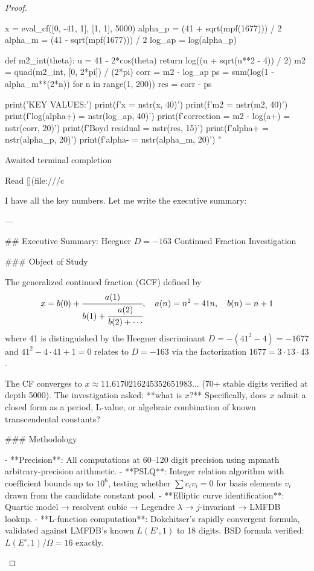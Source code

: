 \begin{theorem}
\begin{lemma}
\begin{proposition}
\begin{corollary}
\begin{proof}
\begin{remark}
x = eval_cf([0, -41, 1], [1, 1], 5000)
alpha_p = (41 + sqrt(mpf(1677))) / 2
alpha_m = (41 - sqrt(mpf(1677))) / 2
log_ap = log(alpha_p)

def m2_int(theta):
    u = 41 - 2*cos(theta)
    return log((u + sqrt(u**2 - 4)) / 2)
m2 = quad(m2_int, [0, 2*pi]) / (2*pi)
corr = m2 - log_ap
ps = sum(log(1 - alpha_m**(2*n)) for n in range(1, 200))
res = corr - ps

print('KEY VALUES:')
print(f'x = {nstr(x, 40)}')
print(f'm2 = {nstr(m2, 40)}')
print(f'log(alpha+) = {nstr(log_ap, 40)}')
print(f'correction = m2 - log(a+) = {nstr(corr, 20)}')
print(f'Boyd residual = {nstr(res, 15)}')
print(f'alpha+ = {nstr(alpha_p, 20)}')
print(f'alpha- = {nstr(alpha_m, 20)}')
"


Awaited terminal completion

Read [](file:///c%

I have all the key numbers. Let me write the executive summary:

---

## Executive Summary: Heegner $D = -163$ Continued Fraction Investigation

### Object of Study

The generalized continued fraction (GCF) defined by
$$x = b(0) + \cfrac{a(1)}{b(1) + \cfrac{a(2)}{b(2) + \cdots}}, \quad a(n) = n^2 - 41n, \quad b(n) = n + 1$$
where 41 is distinguished by the Heegner discriminant $D = -(41^2 - 4) = -1677$ and $41^2 - 4 \cdot 41 + 1 = 0$ relates to $D = -163$ via the factorization $1677 = 3 \cdot 13 \cdot 43$.

The CF converges to $x \approx 11.6170216245352651983\ldots$ (70+ stable digits verified at depth 5000). The investigation asked: **what is $x$?** Specifically, does $x$ admit a closed form as a period, L-value, or algebraic combination of known transcendental constants?

### Methodology

- **Precision**: All computations at 60–120 digit precision using mpmath arbitrary-precision arithmetic.
- **PSLQ**: Integer relation algorithm with coefficient bounds up to $10^6$, testing whether $\sum c_i v_i = 0$ for basis elements $v_i$ drawn from the candidate constant pool.
- **Elliptic curve identification**: Quartic model → resolvent cubic → Legendre $\lambda$ → $j$-invariant → LMFDB lookup.
- **L-function computation**: Dokchitser's rapidly convergent formula, validated against LMFDB's known $L(E',1)$ to 18 digits. BSD formula verified: $L(E',1)/\Omega = 16$ exactly.


\end{remark}
\end{proof}
\end{corollary}
\end{proposition}
\end{lemma}
\end{theorem}
